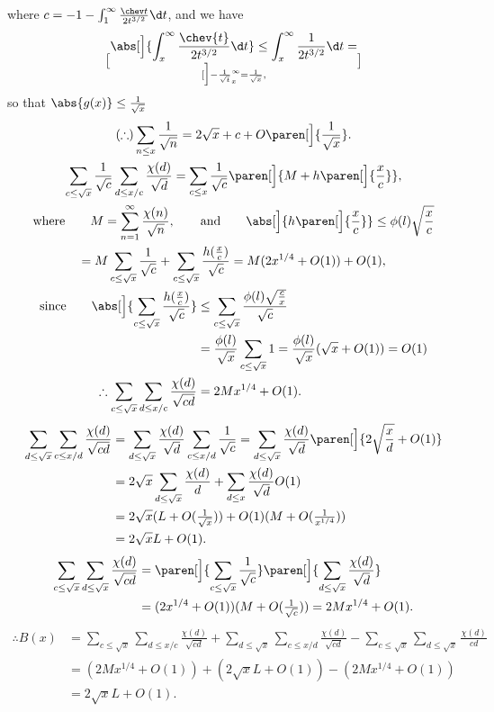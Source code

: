 where $c=-1-\int_1^\infty\frac{\chev t}{2t^{3/2}}\d t$, and we have
\[ \abs[\Big]{\int_x^\infty\frac{\chev{t}}{2t^{3/2}}\d t} \leq \int_x^\infty \frac{1}{2t^{3/2}} \d t = \brack[\Big]{-\frac{1}{\sqrt t}}_x^\infty = \frac1{\sqrt x} , \]
so that $\abs{g(x)}\leq\frac{1}{\sqrt x}$
\begin{gather*}
(\therefore) \sum_{n\leq x}\frac1{\sqrt n} = 2\sqrt x + c + O\paren[\Big]{\frac1{\sqrt x}} . \\
\sum_{c\leq\sqrt x}\frac1{\sqrt c}\sum_{d\leq x/c}\frac{\chi(d)}{\sqrt d} = \sum_{c\leq x}\frac{1}{\sqrt c}\paren[\Big]{M+h\paren[\Big]{\frac xc}} , \\
\text{where}\qquad M = \sum_{n=1}^\infty \frac{\chi(n)}{\sqrt n},\qquad \text{and}\qquad \abs[\Big]{h\paren[\Big]{\frac xc}} \leq \phi(l) \sqrt{\frac{x}{c}} \\
= M \sum_{c\leq\sqrt x}\frac1{\sqrt c} + \sum_{c\leq\sqrt x}\frac{h(\frac xc)}{\sqrt c} = M(2x^{1/4}+O(1)) + O(1) , \\
\begin{aligned}
\text{since}\qquad \abs[\Big]{\sum_{c\leq\sqrt x}\frac{h(\frac xc)}{\sqrt c}} &\leq \sum_{c\leq\sqrt x}\frac{\phi(l)\sqrt{\frac cx}}{\sqrt c} \\
&= \frac{\phi(l)}{\sqrt x} \sum_{c\leq\sqrt x}1 = \frac{\phi(l)}{\sqrt x}(\sqrt x+O(1)) = O(1) \\
\therefore \sum_{c\leq\sqrt x}\sum_{d\leq x/c}\frac{\chi(d)}{\sqrt{cd}} &= 2Mx^{1/4} + O(1) .
\end{aligned}
\end{gather*}
\begin{align*}
\sum_{d\leq\sqrt x}\sum_{c\leq x/d}\frac{\chi(d)}{\sqrt{cd}} &= \sum_{d\leq\sqrt x}\frac{\chi(d)}{\sqrt d}\sum_{c\leq x/d}\frac{1}{\sqrt c} = \sum_{d\leq\sqrt x}\frac{\chi(d)}{\sqrt d}\paren[\Big]{2\sqrt{\frac xd}+O(1)} \\
&= 2\sqrt x\sum_{d\leq\sqrt x}\frac{\chi(d)}{d} + \sum_{d\leq x}\frac{\chi(d)}{\sqrt d}O(1) \\
&= 2\sqrt x(L+O(\tfrac1{\sqrt x})) + O(1)(M+O(\tfrac1{x^{1/4}})) \\
&= 2\sqrt xL+O(1) .
\end{align*}
\begin{align*}
\sum_{c\leq\sqrt x}\sum_{d\leq\sqrt x}\frac{\chi(d)}{\sqrt{cd}} &= \paren[\Big]{\sum_{c\leq\sqrt x}\frac1{\sqrt c}}\paren[\Big]{\sum_{d\leq\sqrt x}\frac{\chi(d)}{\sqrt d}} \\
&= (2x^{1/4}+O(1))(M+O(\tfrac1{\sqrt c})) = 2Mx^{1/4} + O(1) .
\end{align*}
\begin{align*}
\therefore B(x) &= \sum_{c\leq\sqrt x}\sum_{d\leq x/c}\frac{\chi(d)}{\sqrt{cd}} + \sum_{d\leq\sqrt x}\sum_{c\leq x/d}\frac{\chi(d)}{\sqrt{cd}} - \sum_{c\leq\sqrt x}\sum_{d\leq\sqrt x}\frac{\chi(d)}{cd} \\
&= (2Mx^{1/4}+O(1)) + (2\sqrt xL+O(1)) - (2Mx^{1/4}+O(1)) \\
&= 2\sqrt x L + O(1) .
\end{align*}
